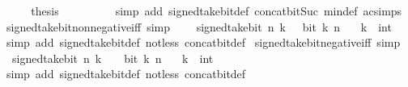 \begin{isabellebody}
\ \ \isamarkupfalse%
\ \isamarkupfalse%
\ {\isacharquery}{\kern0pt}thesis\isanewline
\ \ \ \ \isamarkupfalse%
\ {\isacharasterisk}{\kern0pt}\ {\isacharasterisk}{\kern0pt}{\isacharasterisk}{\kern0pt}\ \isamarkupfalse%
\ {\isacharparenleft}{\kern0pt}simp\ add{\isacharcolon}{\kern0pt}\ signed{\isacharunderscore}{\kern0pt}take{\isacharunderscore}{\kern0pt}bit{\isacharunderscore}{\kern0pt}def\ concat{\isacharunderscore}{\kern0pt}bit{\isacharunderscore}{\kern0pt}Suc\ min{\isacharunderscore}{\kern0pt}def\ ac{\isacharunderscore}{\kern0pt}simps{\isacharparenright}{\kern0pt}\isanewline
{}\isamarkupfalse%
%
\endisatagproof
{\isafoldproof}%
%
\isadelimproof
\isanewline
%
\endisadelimproof
\isanewline
{}\isamarkupfalse%
\ signed{\isacharunderscore}{\kern0pt}take{\isacharunderscore}{\kern0pt}bit{\isacharunderscore}{\kern0pt}nonnegative{\isacharunderscore}{\kern0pt}iff\ {\isacharbrackleft}{\kern0pt}simp{\isacharbrackright}{\kern0pt}{\isacharcolon}{\kern0pt}\isanewline
\ \ {\isacartoucheopen}{}\ {\isasymle}\ signed{\isacharunderscore}{\kern0pt}take{\isacharunderscore}{\kern0pt}bit\ n\ k\ {\isasymlongleftrightarrow}\ {\isasymnot}\ bit\ k\ n{\isacartoucheclose}\isanewline
\ \ \ k\ {\isacharcolon}{\kern0pt}{\isacharcolon}{\kern0pt}\ int\isanewline
%
\isadelimproof
\ \ %
\endisadelimproof
%
\isatagproof
{}\isamarkupfalse%
\ {\isacharparenleft}{\kern0pt}simp\ add{\isacharcolon}{\kern0pt}\ signed{\isacharunderscore}{\kern0pt}take{\isacharunderscore}{\kern0pt}bit{\isacharunderscore}{\kern0pt}def\ not{\isacharunderscore}{\kern0pt}less\ concat{\isacharunderscore}{\kern0pt}bit{\isacharunderscore}{\kern0pt}def{\isacharparenright}{\kern0pt}%
\endisatagproof
{\isafoldproof}%
%
\isadelimproof
\isanewline
%
\endisadelimproof
\isanewline
{}\isamarkupfalse%
\ signed{\isacharunderscore}{\kern0pt}take{\isacharunderscore}{\kern0pt}bit{\isacharunderscore}{\kern0pt}negative{\isacharunderscore}{\kern0pt}iff\ {\isacharbrackleft}{\kern0pt}simp{\isacharbrackright}{\kern0pt}{\isacharcolon}{\kern0pt}\isanewline
\ \ {\isacartoucheopen}signed{\isacharunderscore}{\kern0pt}take{\isacharunderscore}{\kern0pt}bit\ n\ k\ {\isacharless}{\kern0pt}\ {}\ {\isasymlongleftrightarrow}\ bit\ k\ n{\isacartoucheclose}\isanewline
\ \ \ k\ {\isacharcolon}{\kern0pt}{\isacharcolon}{\kern0pt}\ int\isanewline
%
\isadelimproof
\ \ %
\endisadelimproof
%
\isatagproof
{}\isamarkupfalse%
\ {\isacharparenleft}{\kern0pt}simp\ add{\isacharcolon}{\kern0pt}\ signed{\isacharunderscore}{\kern0pt}take{\isacharunderscore}{\kern0pt}bit{\isacharunderscore}{\kern0pt}def\ not{\isacharunderscore}{\kern0pt}less\ concat{\isacharunderscore}{\kern0pt}bit{\isacharunderscore}{\kern0pt}def{\isacharparenright}{\kern0pt}%

\end{isabellebody}
